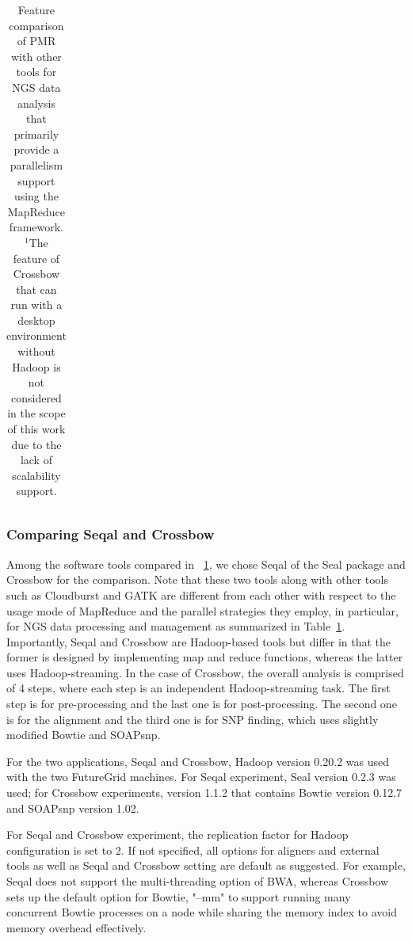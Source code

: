 \documentclass{acm_proc_article-sp}
\begin{document}
\begin{center}
\begin{table}[ht]
{\begin{tabular}{|l|l|c|c|c|c|c|c|}
\hline
\end{tabular}}
\hfill{}
\caption{Feature comparison of PMR with other tools for NGS data analysis that primarily provide a parallelism support using the MapReduce framework.  $^{1}${The feature of Crossbow that can run with a desktop environment without Hadoop is not considered in the scope of this work due to the lack of scalability support.} }
 \label{table:mr-comparison}
\end{table}
\end{center}

\subsubsection{Comparing Seqal and Crossbow}
Among the software tools compared in ~\ref{table:mr-comparison}, we
chose Seqal of the Seal package and Crossbow for the comparison.  Note
that these two tools along with other tools such as Cloudburst and
GATK are different from each other with respect to the usage mode of
MapReduce and the parallel strategies they employ, in particular, for
NGS data processing and management as summarized in
Table~\ref{table:mr-comparison}.  Importantly, Seqal and Crossbow are
Hadoop-based tools but differ in that the former is designed
by implementing map and reduce functions, whereas the
latter uses Hadoop-streaming.  In the case of Crossbow, the overall
analysis is comprised of 4 steps, where each step is an independent
Hadoop-streaming task. The first step is for pre-processing and the
last one is for post-processing. The second one is for the alignment
and the third one is for SNP finding, which uses slightly modified
Bowtie and SOAPsnp.

For the two applications, Seqal and Crossbow, Hadoop version 0.20.2
was used with the two FutureGrid machines.  For Seqal experiment, Seal
version 0.2.3 was used; for Crossbow experiments, version
1.1.2 that contains Bowtie version 0.12.7 and SOAPsnp version 1.02.

For Seqal and Crossbow experiment, the replication factor for Hadoop
configuration is set to 2.  If not specified, all options for aligners
and external tools as well as Seqal and Crossbow setting are default
as suggested.  For example, Seqal does not support the multi-threading
option of BWA, whereas Crossbow sets up the default option for Bowtie,
"--mm" to support running many concurrent Bowtie processes on a node
while sharing the memory index to avoid memory overhead effectively.
\end{document}
